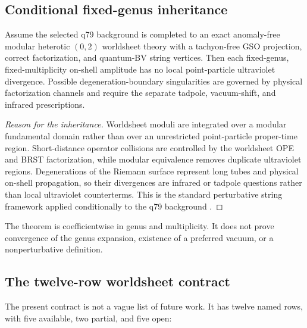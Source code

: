 \documentclass[11pt]{article}
\begin{document}
\subsection{Conditional fixed-genus inheritance}

\begin{theorem}
\label{thm:inheritance}
Assume the selected q79 background is completed to an exact anomaly-free
modular heterotic \((0,2)\) worldsheet theory with a tachyon-free GSO
projection, correct factorization, and quantum-BV string vertices. Then each
fixed-genus, fixed-multiplicity on-shell amplitude has no local
point-particle ultraviolet divergence. Possible degeneration-boundary
singularities are governed by physical factorization channels and require
the separate tadpole, vacuum-shift, and infrared prescriptions.
\end{theorem}

\begin{proof}[Reason for the inheritance]
Worldsheet moduli are integrated over a modular fundamental domain rather
than over an unrestricted point-particle proper-time region. Short-distance
operator collisions are controlled by the worldsheet OPE and BRST
factorization, while modular equivalence removes duplicate ultraviolet
regions. Degenerations of the Riemann surface represent long tubes and
physical on-shell propagation, so their divergences are infrared or tadpole
questions rather than local ultraviolet counterterms. This is the standard
perturbative string framework applied conditionally to the q79 background
\cite{Polchinski1998v1,SenSuperstringPerturbation,SenUVIR2015}.
\end{proof}

The theorem is coefficientwise in genus and multiplicity. It does not prove
convergence of the genus expansion, existence of a preferred vacuum, or a
nonperturbative definition.

\subsection{The twelve-row worldsheet contract}

The present contract is not a vague list of future work. It has twelve named
rows, with five available, two partial, and five open:
\end{document}
